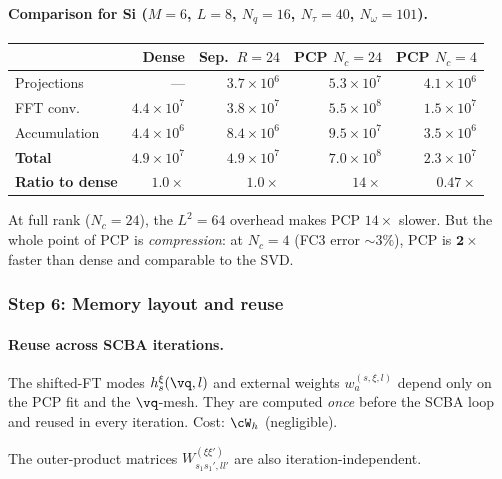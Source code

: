\paragraph{Comparison for Si ($M = 6$, $L = 8$, $N_q = 16$,
  $N_\tau = 40$, $N_\omega = 101$).}

\begin{center}
\renewcommand{\arraystretch}{1.3}
\begin{tabular}{l@{\qquad}rrrr}
  \toprule
  & Dense & Sep.\ $R{=}24$ & PCP $N_c{=}24$ & PCP $N_c{=}4$ \\
  \midrule
  Projections
    & --- & $3.7 \times 10^6$ & $5.3 \times 10^7$ & $4.1 \times 10^6$ \\
  FFT conv.
    & $4.4 \times 10^7$ & $3.8 \times 10^7$ & $5.5 \times 10^8$ & $1.5 \times 10^7$ \\
  Accumulation
    & $4.4 \times 10^6$ & $8.4 \times 10^6$ & $9.5 \times 10^7$ & $3.5 \times 10^6$ \\
  \midrule
  \textbf{Total}
    & $4.9 \times 10^7$ & $4.9 \times 10^7$ & $7.0 \times 10^8$ & $2.3 \times 10^7$ \\
  \textbf{Ratio to dense}
    & $1.0\times$ & $1.0\times$ & $14\times$ & $\mathbf{0.47\times}$ \\
  \bottomrule
\end{tabular}
\end{center}

At full rank ($N_c = 24$), the $L^2 = 64$ overhead makes PCP
$14\times$ slower.  But the whole point of PCP is \emph{compression}:
at $N_c = 4$ (FC3 error $\sim 3\%$), PCP is $\mathbf{2\times}$
faster than dense and comparable to the SVD.


\subsubsection{Step 6: Memory layout and reuse}
\label{sssub:memory}

\paragraph{Reuse across SCBA iterations.}
The shifted-FT modes $h_s^\xi(\vq, l)$ and external weights
$w_a^{(s,\xi,l)}$ depend only on the PCP fit and the $\vq$-mesh.
They are computed \emph{once} before the SCBA loop and reused in
every iteration.  Cost: $\cW_h$ (negligible).

The outer-product matrices $W^{(\xi\xi')}_{s_1 s_1', ll'}$ are
also iteration-independent.

